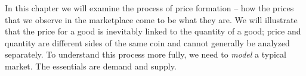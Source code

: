 In this chapter we will examine the process of price formation -- how the
prices that we observe in the marketplace come to be what they are. We will
illustrate that the price for a good is inevitably linked to the quantity of
a good; price and quantity are different sides of the same coin and cannot
generally be analyzed separately. To understand this process more fully, we
need to \textit{model} a typical market. The essentials are demand and
supply.